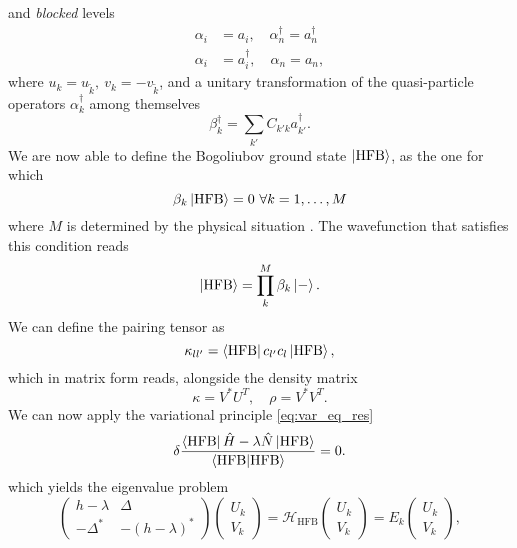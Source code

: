 and \textit{blocked} levels
\begin{align}
\alpha_i &= a_i,\quad \alpha_n^\dagger = a_n^\dagger
\\\alpha_i &= a_i^\dagger, \quad \alpha_n = a_n,
\end{align}
where $u_k=u_{\tilde k},\ v_k=-v_{\tilde k}$, and a unitary transformation of the quasi-particle operators $\alpha_k^\dagger$ among themselves
\begin{equation}
    \beta_k^ \dagger = \sum_{k'}C_{k'k}a_{k'}^\dagger.
\end{equation}
We are now able to define the Bogoliubov ground state $\ket{\text{HFB}}$, as the one for which
\begin{equation}
    \beta_k \ket{\text{HFB}} = 0 \ \forall k = 1,\ldots,M
\end{equation}
where $M$ is determined by the physical situation \cite{ring2004nuclear}.
The wavefunction that satisfies this condition reads
\begin{equation}
\ket{\text{HFB}}=\prod_k^M\beta_k \ket{-}.
\end{equation}
We can define the pairing tensor as
\begin{equation}
    \kappa_{ll'} = \bra{\text{HFB}}c_{l'}c_l\ket{\text{HFB}},
\end{equation}
which in matrix form reads, alongside the density matrix
\begin{equation}
    \kappa = V^*U^T,\quad \rho = V^*V^T.
\end{equation}
We can now apply the variational principle \eqref{eq:var_eq_res}
\begin{equation}
    \label{eq:varhfb}
    \delta \frac{\bra{\text{HFB}} \hat H-\lambda \hat N\ket{\text{HFB}}}{\bra{\text{HFB}}\ket{\text{HFB}}} = 0.
\end{equation}
which yields the eigenvalue problem
\begin{equation}
    \label{eq:eighfb}
    \begin{pmatrix}
    h -\lambda& \Delta \\ -\Delta^* & -(h-\lambda)^*
    \end{pmatrix}
    \begin{pmatrix}
        U_k \\ V_k
    \end{pmatrix}
    =\mathcal H_\text{HFB}\begin{pmatrix}U_k \\V_k\end{pmatrix}= E_k \begin{pmatrix}
        U_k \\ V_k
    \end{pmatrix},
\end{equation}
